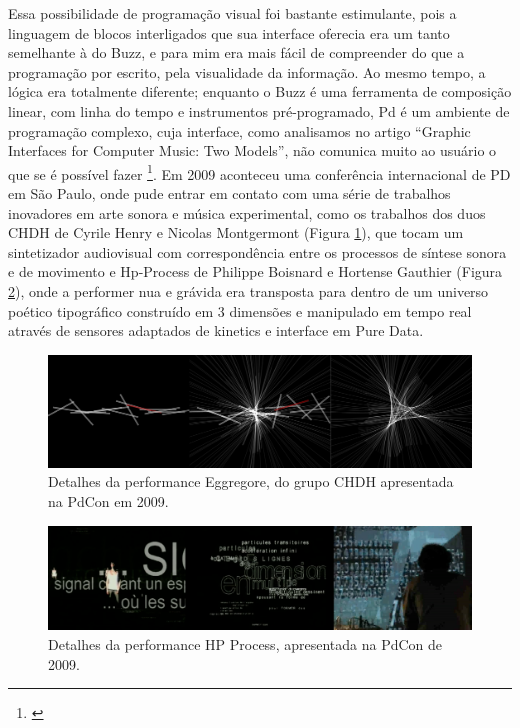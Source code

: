 Essa possibilidade de programação visual foi bastante estimulante, pois a linguagem de blocos interligados que sua interface oferecia era um tanto semelhante à do Buzz, e para mim era mais fácil de compreender do que a programação por escrito, pela visualidade da informação. Ao mesmo tempo, a lógica era totalmente diferente; enquanto o Buzz é uma ferramenta de composição linear, com linha do tempo e instrumentos pré-programado, Pd é um ambiente de programação complexo, cuja interface, como analisamos no artigo ``Graphic Interfaces for Computer Music: Two Models'', não comunica muito ao usuário o que se é possível fazer \footnote{\cite{Stolfi2016}}. 
Em 2009 aconteceu uma conferência internacional de PD em São Paulo, onde pude entrar em contato com uma série de trabalhos inovadores em arte sonora e música experimental, como os trabalhos dos duos CHDH de Cyrile Henry e Nicolas Montgermont (Figura \ref{fig:chdh}), que tocam um sintetizador audiovisual com correspondência entre os processos de síntese sonora e de movimento e Hp-Process de Philippe Boisnard e Hortense Gauthier (Figura \ref{fig:hp}), onde a performer nua e grávida era transposta para dentro de um universo poético tipográfico construído em 3 dimensões e manipulado em tempo real através de sensores adaptados de kinetics e interface em Pure Data. 

\begin{figure}

\includegraphics[width=1\textwidth]{pictures/cap1/CHDH}
\caption{Detalhes da performance Eggregore, do grupo CHDH apresentada na PdCon em 2009.}
\label{fig:chdh}
\end{figure}

\begin{figure}

\includegraphics[width=1\textwidth]{pictures/cap1/hp1}
\caption{Detalhes da performance HP Process, apresentada na PdCon de 2009.}
\label{fig:hp}
\end{figure}

